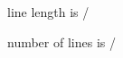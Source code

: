 \documentclass[b6,trimmarks]{bookpackers}
\begin{document}
line length is \number\numexpr\textwidth/\zw\relax\par
number of lines is \the\numexpr\textheight/\Cvs\relax\par

\end{document}
